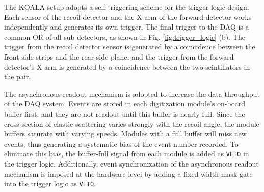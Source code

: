 \documentclass[number,5p]{elsarticle}
\begin{document}
The KOALA setup adopts a self-triggering scheme for the trigger logic design.
Each sensor of the recoil detector and the X arm of the forward detector works independently and generates its own trigger. 
The final trigger to the DAQ is a common OR of all sub-detectors, as shown in Fig. \ref{fig:trigger_logic} (b).
The trigger from the recoil detector sensor is generated by a coincidence between the front-side strips and the rear-side plane, 
and the trigger from the forward detector's X arm is generated by a coincidence
between the two scintillators in the pair.

The asynchronous readout mechanism is adopted to increase the data throughput of the DAQ system.
Events are stored in each digitization module's on-board buffer first,
and they are not readout until this buffer is nearly full.
Since the cross section of elastic scattering varies strongly with the recoil
angle, the module buffers saturate with varying speeds.
Modules with a full buffer will miss new events, thus generating a systematic bias of the event number recorded.
To eliminate this bias, the buffer-full signal from each module is added as \texttt{VETO} in the trigger logic.
Additionally, event synchronization of the asynchronous readout mechanism is imposed at the hardware-level by adding a fixed-width mask gate into the trigger logic as \texttt{VETO}.
\end{document}
